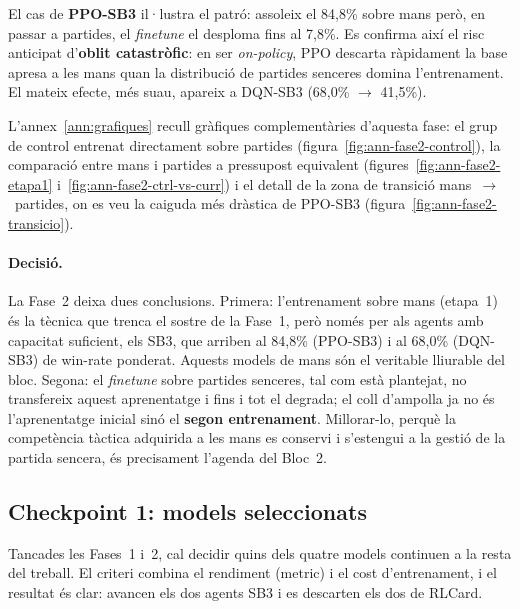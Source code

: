 El cas de \textbf{PPO-SB3} il·lustra el patró: assoleix el 84{,}8\% sobre mans però, en
passar a partides, el \emph{finetune} el desploma fins al 7{,}8\%. Es confirma així el risc
anticipat d'\textbf{oblit catastròfic}: en ser \emph{on-policy}, PPO descarta ràpidament la
base apresa a les mans quan la distribució de partides senceres domina l'entrenament. El
mateix efecte, més suau, apareix a DQN-SB3 (68{,}0\% $\rightarrow$ 41{,}5\%).

L'annex~\ref{ann:grafiques} recull gràfiques complementàries d'aquesta fase: el grup de
control entrenat directament sobre partides (figura~\ref{fig:ann-fase2-control}), la
comparació entre mans i partides a pressupost equivalent
(figures~\ref{fig:ann-fase2-etapa1} i~\ref{fig:ann-fase2-ctrl-vs-curr}) i el detall de la
zona de transició mans~$\rightarrow$~partides, on es veu la caiguda més dràstica de PPO-SB3
(figura~\ref{fig:ann-fase2-transicio}).

\paragraph{Decisió.} La Fase~2 deixa dues conclusions. Primera: l'entrenament sobre mans
(etapa~1) és la tècnica que trenca el sostre de la Fase~1, però només per als agents amb
capacitat suficient, els \ac{SB3}, que arriben al 84{,}8\% (PPO-SB3) i al 68{,}0\% (DQN-SB3)
de win-rate ponderat. Aquests models de mans són el veritable lliurable del bloc. Segona: el
\emph{finetune} sobre partides senceres, tal com està plantejat, no transfereix aquest
aprenentatge i fins i tot el degrada; el coll d'ampolla ja no és l'aprenentatge inicial sinó
el \textbf{segon entrenament}. Millorar-lo, perquè la competència tàctica adquirida a les
mans es conservi i s'estengui a la gestió de la partida sencera, és precisament l'agenda del
Bloc~2.

\subsection{Checkpoint 1: models seleccionats}
\label{sec:checkpoint1}

Tancades les Fases~1 i~2, cal decidir quins dels quatre models continuen a la resta del
treball. El criteri combina el rendiment (\(\text{metric}\)) i el cost d'entrenament, i el
resultat és clar: avancen els dos agents \ac{SB3} i es descarten els dos de RLCard.

